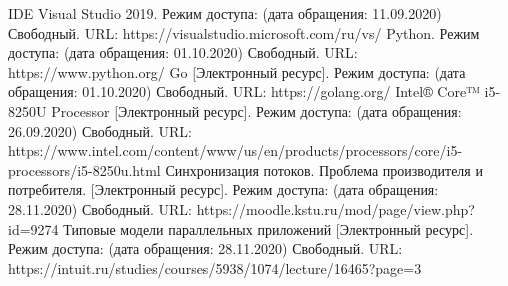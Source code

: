 


	
	\begin{center}
	\begin{thebibliography}{3}
	IDE Visual Studio 2019. Режим доступа: (дата обращения: 11.09.2020) Свободный. URL: https://visualstudio.microsoft.com/ru/vs/
	Python. Режим доступа: (дата обращения: 01.10.2020) Свободный. URL: https://www.python.org/
	Go [Электронный ресурс]. Режим доступа: (дата обращения: 01.10.2020) Свободный. URL: https://golang.org/
	Intel® Core™ i5-8250U Processor [Электронный ресурс]. Режим доступа: (дата обращения: 26.09.2020) Свободный. URL: https://www.intel.com/content/www/us/en/products/processors/core/i5-processors/i5-8250u.html
	Синхронизация потоков. Проблема производителя и потребителя. [Электронный ресурс]. Режим доступа: (дата обращения: 28.11.2020) Свободный. URL: https://moodle.kstu.ru/mod/page/view.php?id=9274
	Типовые модели параллельных приложений [Электронный ресурс]. Режим доступа: (дата обращения: 28.11.2020) Свободный. URL: https://intuit.ru/studies/courses/5938/1074/lecture/16465?page=3

	\end{thebibliography}
	\end{center}